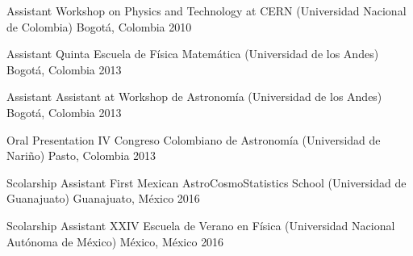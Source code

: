 


\begin{cvhonors}


\cvhonor
{Assistant} %
{Workshop on Physics and Technology at CERN (Universidad Nacional de Colombia)} %
{Bogotá, Colombia} %
{2010} %

\cvhonor
{Assistant} %
{Quinta Escuela de Física Matemática (Universidad de los Andes)} %
{Bogotá, Colombia} %
{2013} %

\cvhonor
{Assistant} %
{Assistant at Workshop de Astronomía (Universidad de los Andes)} %
{Bogotá, Colombia} %
{2013} %

\cvhonor
{Oral Presentation} %
{IV Congreso Colombiano de Astronomía (Universidad de Nariño)} %
{Pasto, Colombia} %
{2013} %

\cvhonor
{Scolarship Assistant} %
{First Mexican AstroCosmoStatistics School (Universidad de Guanajuato)} %
{Guanajuato, México} %
{2016} %

\cvhonor
{Scolarship Assistant} %
{XXIV Escuela de Verano en Física (Universidad Nacional Autónoma de México)} %
{México, México} %
{2016} %

\end{cvhonors}
